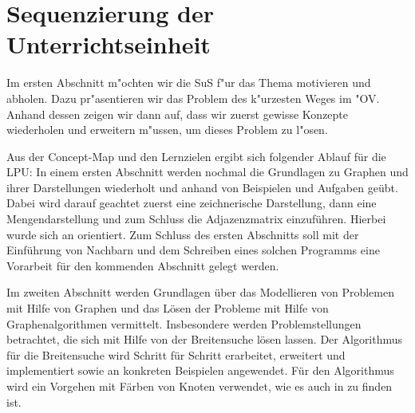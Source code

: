 \section{Sequenzierung der Unterrichtseinheit}\label{lpu:inhalt}

Im ersten Abschnitt m"ochten wir die SuS f"ur das Thema motivieren und abholen.
Dazu pr"asentieren wir das Problem des k"urzesten Weges im "OV. 
Anhand dessen zeigen wir dann auf, dass wir zuerst gewisse Konzepte wiederholen und erweitern m"ussen, um dieses Problem zu l"osen.

Aus der Concept-Map und den Lernzielen ergibt sich folgender Ablauf für die LPU:
In einem ersten Abschnitt werden nochmal die Grundlagen zu Graphen und ihrer Darstellungen wiederholt und anhand von Beispielen und Aufgaben geübt. 
Dabei wird darauf geachtet zuerst eine zeichnerische Darstellung, dann eine Mengendarstellung und zum Schluss die Adjazenzmatrix einzuführen. 
Hierbei wurde sich an \cite{cormen,ottmann} orientiert.
Zum Schluss des ersten Abschnitts soll mit der Einführung von Nachbarn und dem Schreiben eines solchen Programms eine Vorarbeit für den kommenden Abschnitt gelegt werden.

Im zweiten Abschnitt werden Grundlagen \"uber das Modellieren von Problemen mit Hilfe von Graphen und das L\"osen der Probleme mit Hilfe von Graphenalgorithmen vermittelt. Insbesondere werden Problemstellungen betrachtet, die sich mit Hilfe von der Breitensuche l\"osen lassen. Der Algorithmus f\"ur die Breitensuche wird Schritt f\"ur Schritt erarbeitet, erweitert und implementiert sowie an konkreten Beispielen angewendet. F\"ur den Algorithmus wird ein Vorgehen mit F\"arben von Knoten verwendet, wie es auch in \cite{cormen} zu finden ist.